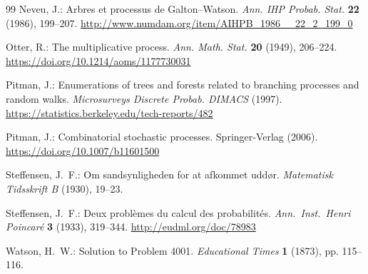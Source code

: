 \documentclass[11pt,a4paper,leqno]{amsart}
\theoremstyle{plain}
\theoremstyle{definition}
\numberwithin{equation}{section}
\begin{document}
\begin{thebibliography}{99}
		Neveu, J.: 
		Arbres et processus de Galton–Watson.  
		\emph{Ann. IHP Probab. Stat.} \textbf{22} (1986), 199–207.  
		\url{http://www.numdam.org/item/AIHPB_1986__22_2_199_0}
		
		Otter, R.: 
		The multiplicative process.  
		\emph{Ann. Math. Stat.} \textbf{20} (1949), 206–224.  
		\url{https://doi.org/10.1214/aoms/1177730031}
		
		Pitman, J.: 
		Enumerations of trees and forests related to branching processes and random walks.  
		\emph{Microsurveys Discrete Probab. DIMACS} (1997).  
		\url{https://statistics.berkeley.edu/tech-reports/482}
		
		Pitman, J.: 
		Combinatorial stochastic processes.  
		Springer‑Verlag (2006).  
		\url{https://doi.org/10.1007/b11601500}
		
		Steffensen, J.~F.:  
		Om sandsynligheden for at afkommet uddør.  
		\emph{Matematisk Tidsskrift B} (1930), 19--23.  
		
		Steffensen, J.~F.:  
		Deux problèmes du calcul des probabilités.  
		\emph{Ann.\ Inst.\ Henri Poincaré} \textbf{3} (1933), 319--344.  \url{http://eudml.org/doc/78983}
		
		Watson, H.~W.:  
		Solution to Problem 4001.  
		\emph{Educational Times} \textbf{1} (1873), pp. 115–116.
		
	\end{thebibliography}
	
	
	
	
\end{document}
